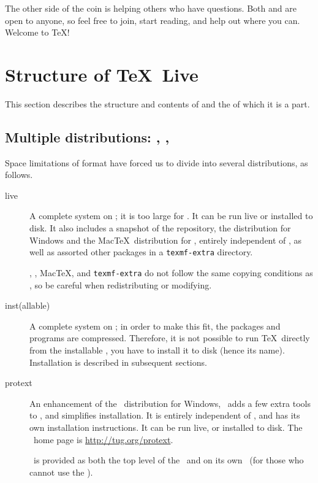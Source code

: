 \documentclass{article}
\begin{document}
The other side of the coin is helping others who have questions.  Both
 and  are open to anyone, so feel
free to join, start reading, and help out where you can.  Welcome to
\TeX{}!


\section{Structure of \protect\TeX\protect\ Live}
\label{sec:struct-tl}

This section describes the structure and contents of \TL{} and the
\TK{} of which it is a part.

\subsection{Multiple distributions: \protect{},
            \protect{},
            \protect{}}
\label{sec:multiple-dist}

Space limitations of  format have forced us to divide
\TK{} into several distributions, as follows.

\begin{description}

\item [live] A complete system on ; it is too large
for .  It can be run live or installed to disk.  It also
includes a snapshot of the \CTAN{} repository, the  
distribution for Windows and the Mac\TeX\ distribution for \MacOSX, entirely 
independent of \TL{}, as well as assorted other packages in a 
\texttt{texmf-extra} directory.

\CTAN{}, , Mac\TeX, and \texttt{texmf-extra} do not follow
the same copying conditions as \TL{}, so be careful when redistributing or
modifying.

\item [inst(allable)] A complete system on \CD; in order to make this fit,
the packages and programs are compressed.  Therefore, it is not possible
to run \TeX\ directly from the installable \CD, you have to install it
to disk (hence its name). Installation is described in subsequent sections.
   
\item [protext] An enhancement of the \MIKTEX\ distribution for Windows,
\ProTeXt\ adds a few extra tools to \MIKTEX, and simplifies
installation.  It is entirely independent of \TL{}, and has its own
installation instructions.  It can be run live, or installed to disk.
The \ProTeXt\ home page is \url{http://tug.org/protext}.

\ProTeXt\ is provided as both the top level of the  \DVD\
and on its own \CD\ (for those who cannot use the \DVD).

\end{description}
\end{document}
